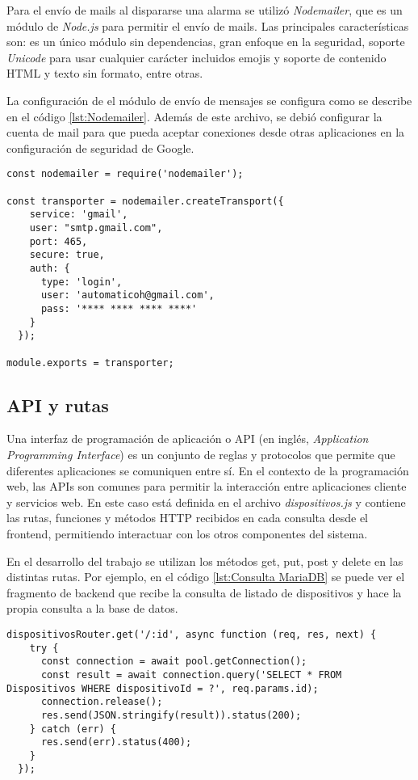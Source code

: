 Para el envío de mails al dispararse una alarma se utilizó \textit{Nodemailer}, que es un módulo de \textit{Node.js} para permitir el envío de mails. Las principales características son: es un único módulo sin dependencias, gran enfoque en la seguridad, soporte \textit{Unicode} para usar cualquier carácter incluidos emojis y soporte de contenido HTML y texto sin formato, entre otras.\citep{26}

La configuración de el módulo de envío de mensajes se configura como se describe en el código \ref{lst:Nodemailer}. Además de este archivo, se debió configurar la cuenta de mail para que pueda aceptar conexiones desde otras aplicaciones en la configuración de seguridad de Google.

\begin{lstlisting}[caption={Configuración del módulo de envío de mails}, label={lst:Nodemailer}]
const nodemailer = require('nodemailer');

const transporter = nodemailer.createTransport({
    service: 'gmail',
    user: "smtp.gmail.com",
    port: 465,
    secure: true,
    auth: {
      type: 'login',
      user: 'automaticoh@gmail.com',
      pass: '**** **** **** ****'
    }
  });

module.exports = transporter;
\end{lstlisting}

\subsection{API y rutas}

Una interfaz de programación de aplicación o API (en inglés, \textit{Application Programming Interface}) es un conjunto de reglas y protocolos que permite que diferentes aplicaciones se comuniquen entre sí. En el contexto de la programación web, las APIs son comunes para permitir la interacción entre aplicaciones cliente y servicios web. En este caso está definida en el archivo \textit{dispositivos.js} y contiene las rutas, funciones y métodos HTTP recibidos en cada consulta desde el frontend, permitiendo interactuar con los otros componentes del sistema.

En el desarrollo del trabajo se utilizan los métodos get, put, post y delete en las distintas rutas. Por ejemplo, en el código \ref{lst:Consulta MariaDB} se puede ver el fragmento de backend que recibe la consulta de listado de dispositivos y hace la propia consulta a la base de datos.

\begin{lstlisting}[caption={Consulta de listado de dispositivos al backend}, label={lst:Consulta MariaDB}]
dispositivosRouter.get('/:id', async function (req, res, next) {
    try {
      const connection = await pool.getConnection();
      const result = await connection.query('SELECT * FROM Dispositivos WHERE dispositivoId = ?', req.params.id);
      connection.release();
      res.send(JSON.stringify(result)).status(200);
    } catch (err) {
      res.send(err).status(400);
    }
  });
\end{lstlisting}

